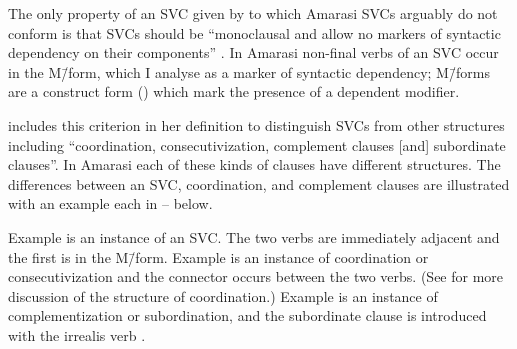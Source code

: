 The only property of an SVC given by \cite{ai06} to which Amarasi
SVCs arguably do not conform is that SVCs should be
``monoclausal and allow no markers of syntactic dependency on their components'' \cite[6]{ai06}.
In Amarasi non-final verbs of an SVC occur in the M\=/form,
which I analyse as a marker of syntactic dependency;
M\=/forms are a construct form () which mark the presence
of a dependent modifier.

\cite{ai06} includes this criterion in her definition to distinguish
SVCs from other structures including ``coordination, consecutivization,
complement clauses [and] subordinate clauses''.
In Amarasi each of these kinds of clauses have different structures.
The differences between an SVC, coordination, and complement clauses
are illustrated with an example each in -- below.

Example  is an instance of an SVC.
The two verbs are immediately adjacent and the first is in the M\=/form.
Example  is an instance of coordination
or consecutivization and the connector  occurs between the two verbs.
(See  for more discussion of the structure of coordination.)
Example  is an instance of complementization or subordination,
and the subordinate clause is introduced with the irrealis verb .

\begin{exe}
	\label{ex:SVC}
	\label{ex:130825-6, 0.52}
	\label{ex:130825-6, 21.14}
	\label{ex:130914-1, 1.01}
\end{exe}

